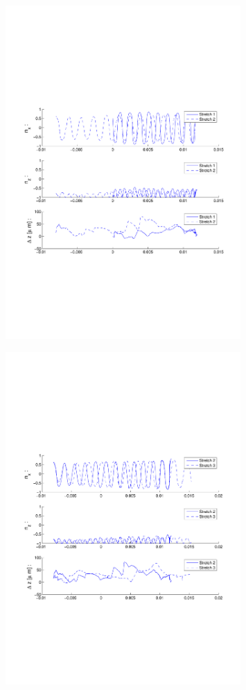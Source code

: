 \begin{figure}[H]

\centering

\includegraphics[width=0.8\textwidth]{Images/Particle 21/Stretch1.pdf}

\end{figure}

\begin{figure}[H]

\centering

\includegraphics[width=0.8\textwidth]{Images/Particle 21/Stretch2.pdf}

\end{figure}
